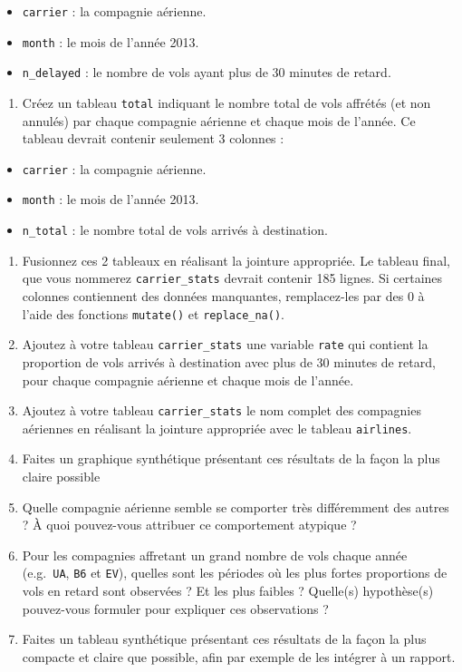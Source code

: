 \documentclass[
  a4paper,
]{article}
\providecommand{\tightlist}{%
  \setlength{\itemsep}{0pt}\setlength{\parskip}{0pt}}
\begin{document}
\begin{itemize}
\tightlist
\item
  \texttt{carrier} : la compagnie aérienne.
\item
  \texttt{month} : le mois de l'année 2013.
\item
  \texttt{n\_delayed} : le nombre de vols ayant plus de 30 minutes de retard.
\end{itemize}

\begin{enumerate}
\def\labelenumi{\arabic{enumi}.}
\setcounter{enumi}{1}
\tightlist
\item
  Créez un tableau \texttt{total} indiquant le nombre total de vols affrétés (et non annulés) par chaque compagnie aérienne et chaque mois de l'année. Ce tableau devrait contenir seulement 3 colonnes :
\end{enumerate}

\begin{itemize}
\tightlist
\item
  \texttt{carrier} : la compagnie aérienne.
\item
  \texttt{month} : le mois de l'année 2013.
\item
  \texttt{n\_total} : le nombre total de vols arrivés à destination.
\end{itemize}

\begin{enumerate}
\def\labelenumi{\arabic{enumi}.}
\setcounter{enumi}{2}
\item
  Fusionnez ces 2 tableaux en réalisant la jointure appropriée. Le tableau final, que vous nommerez \texttt{carrier\_stats} devrait contenir 185 lignes. Si certaines colonnes contiennent des données manquantes, remplacez-les par des 0 à l'aide des fonctions \texttt{mutate()} et \texttt{replace\_na()}.
\item
  Ajoutez à votre tableau \texttt{carrier\_stats} une variable \texttt{rate} qui contient la proportion de vols arrivés à destination avec plus de 30 minutes de retard, pour chaque compagnie aérienne et chaque mois de l'année.
\item
  Ajoutez à votre tableau \texttt{carrier\_stats} le nom complet des compagnies aériennes en réalisant la jointure appropriée avec le tableau \texttt{airlines}.
\item
  Faites un graphique synthétique présentant ces résultats de la façon la plus claire possible
\item
  Quelle compagnie aérienne semble se comporter très différemment des autres ? À quoi pouvez-vous attribuer ce comportement atypique ?
\item
  Pour les compagnies affretant un grand nombre de vols chaque année (e.g.~\texttt{UA}, \texttt{B6} et \texttt{EV}), quelles sont les périodes où les plus fortes proportions de vols en retard sont observées ? Et les plus faibles ? Quelle(s) hypothèse(s) pouvez-vous formuler pour expliquer ces observations ?
\item
  Faites un tableau synthétique présentant ces résultats de la façon la plus compacte et claire que possible, afin par exemple de les intégrer à un rapport.
\end{enumerate}
\end{document}
